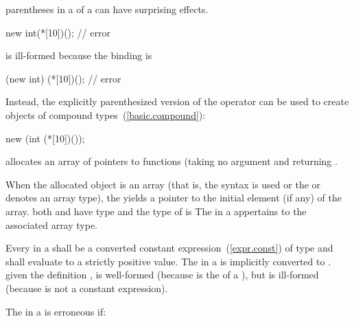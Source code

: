 \pnum
\enternote 
{}%
parentheses in a  of a 
can have surprising effects.
\enterexample 

\begin{codeblock}
new int(*[10])();               // error
\end{codeblock}

is ill-formed because the binding is

\begin{codeblock}
(new int) (*[10])();            // error
\end{codeblock}

Instead, the explicitly parenthesized version of the 
operator can be used to create objects of compound
types~(\ref{basic.compound}):

\begin{codeblock}
new (int (*[10])());
\end{codeblock}

allocates an array of  pointers to functions (taking no
argument and returning .
\exitexample 
\exitnote 

\pnum
{}%
When the allocated object is an array (that is, the
 syntax is used or the
 or  denotes an array type), the
 yields a pointer to the initial element (if
any) of the array.
\enternote 
both  and  have type  and
the type of  is 
\exitnote 
The  in a  appertains
to the associated array type.

\pnum
Every  in a
 shall be a converted constant
expression~(\ref{expr.const}) of type  and
shall evaluate to a strictly positive value.
%
The  in a is
implicitly converted to .
\enterexample
given the definition ,
 is well-formed (because  is the
 of a ), but
 is ill-formed (because  is not a
constant expression).
\exitexample 

\pnum
{}%
The  in a  is
erroneous if:


